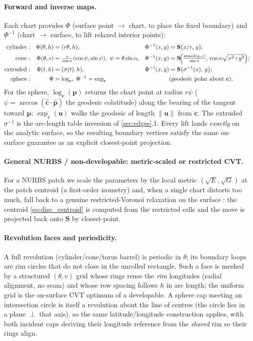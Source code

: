 \documentclass[11pt,a4paper]{article}
\numberwithin{equation}{section}
\newcommand{\norm}[1]{\left\lVert #1 \right\rVert}
\newcommand{\vv}[1]{\mathbf{#1}}
\begin{document}
\paragraph{Forward and inverse maps.}
Each chart provides $\Phi$ (surface point $\to$ chart, to place the fixed
boundary) and $\Phi^{-1}$ (chart $\to$ surface, to lift relaxed interior points):
\begin{align}
\label{eq:chartmaps}
\text{cylinder}&: & \Phi(\theta,h)&=(r\theta,h), &
   \Phi^{-1}(x,y)&=\vv{S}\bigl(x/r,\,y\bigr);\notag\\
\text{cone}&: & \Phi(\theta,s)&=\tfrac{s}{\cos\alpha}(\cos\psi,\sin\psi),\
   \psi=\theta\sin\alpha, &
   \Phi^{-1}(x,y)&=\vv{S}\!\Bigl(\tfrac{\operatorname{atan2}(y,x)}{\sin\alpha},\,
     \cos\alpha\sqrt{x^2{+}y^2}\Bigr);\\
\text{extruded}&: & \Phi(t,h)&=(\sigma(t),h), &
   \Phi^{-1}(x,y)&=\vv{S}\bigl(\sigma^{-1}(x),\,y\bigr);\notag\\
\text{sphere}&: & \Phi&=\log_{\vv c},\ \Phi^{-1}=\exp_{\vv c}
   &&\text{(geodesic polar about $\vv c$).}\notag
\end{align}
For the sphere, $\log_{\vv c}(\vv{p})$ returns the chart point at radius $r\psi$
($\psi=\arccos(\hat{\vv c}\!\cdot\!\hat{\vv p})$ the geodesic colatitude) along
the bearing of the tangent toward $\vv{p}$; $\exp_{\vv c}(\vv{u})$ walks the
geodesic of length $\norm{\vv{u}}$ from $\vv c$. The extruded $\sigma^{-1}$ is
the arc-length table inversion of \cref{sec:edges}.1. Every lift lands
\emph{exactly} on the analytic surface, so the resulting boundary vertices
satisfy the same on-surface guarantee as an explicit closest-point projection.

\paragraph{General NURBS / non-developable: metric-scaled or restricted CVT.}
For a NURBS patch we scale the parameters by the local metric
$(\sqrt{E},\sqrt{G})$ at the patch centroid (a first-order isometry) and, when a
single chart distorts too much, fall back to a genuine restricted-Voronoi
relaxation on the surface \cite{YanLevy2009,LevyLiu2010}: the centroid
\eqref{eq:disc_centroid} is computed from the restricted cells and the move is
projected back onto $\vv{S}$ by closest-point.

\paragraph{Revolution faces and periodicity.}
A full revolution (cylinder/cone/torus barrel) is periodic in $\theta$; its
boundary loops are rim circles that do not close in the unrolled rectangle.
Such a face is meshed by a structured $(\theta,v)$ grid whose rings reuse the
\emph{rim} longitudes (radial alignment, no seam) and whose row spacing follows
$h$ in arc length; the uniform grid is the on-surface CVT optimum of a
developable. A sphere cap meeting an intersection circle is itself a revolution
about the line of centres (the circle lies in a plane $\perp$ that axis), so the
same latitude/longitude construction applies, with both incident caps deriving
their longitude reference from the \emph{shared} rim so their rings align.
\end{document}
